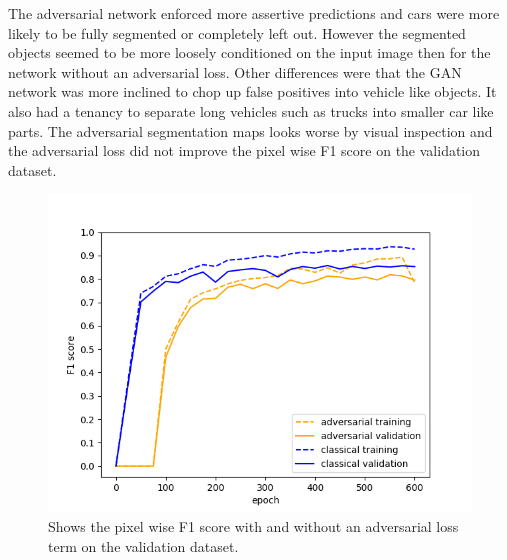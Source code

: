\documentclass{kththesis}
\begin{document}
\noindent The adversarial network enforced more assertive predictions and cars were more likely to be fully segmented or completely left out. However the segmented objects seemed to be more loosely conditioned on the input image then for the network without an adversarial loss. Other differences were that the GAN network was more inclined to chop up false positives into vehicle like objects. It also had a tenancy to separate long vehicles such as trucks into smaller car like parts. The adversarial segmentation maps looks worse by visual inspection and the adversarial loss did not improve the pixel wise F1 score on the validation dataset.
\begin{figure}[H]
\centering
      \includegraphics[scale=0.6]{classical_vs_adversarial}
  \caption{Shows the pixel wise F1 score with and without an adversarial loss term on the validation dataset.} \label{fig:gan_vs_class}
\end{figure}
\newpage
\end{document}
